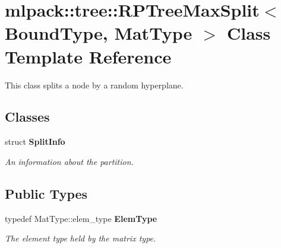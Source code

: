 \section{mlpack\+:\+:tree\+:\+:R\+P\+Tree\+Max\+Split$<$ Bound\+Type, Mat\+Type $>$ Class Template Reference}
\label{classmlpack_1_1tree_1_1RPTreeMaxSplit}


This class splits a node by a random hyperplane.  


\subsection*{Classes}
\begin{DoxyCompactItemize}
\item 
struct {\bf Split\+Info}
\begin{DoxyCompactList}\small\item\em An information about the partition. \end{DoxyCompactList}\end{DoxyCompactItemize}
\subsection*{Public Types}
\begin{DoxyCompactItemize}
\item 
typedef Mat\+Type\+::elem\+\_\+type {\bf Elem\+Type}
\begin{DoxyCompactList}\small\item\em The element type held by the matrix type. \end{DoxyCompactList}\end{DoxyCompactItemize}
